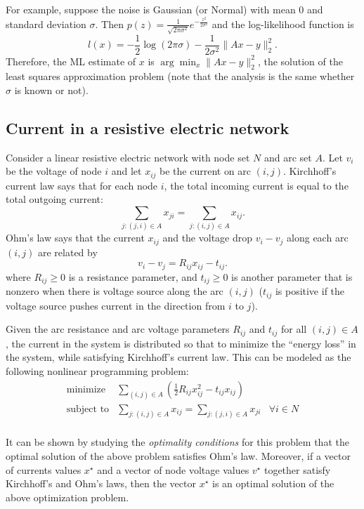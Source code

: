 \documentclass[11pt]{article}
\newcommand{\oh}{\frac12}
\newcommand{\st}{\text{subject to}}
\begin{document}
For example, suppose the noise is Gaussian (or Normal) with mean $0$ and standard deviation $\sigma$. Then $p(z)=\frac{1}{\sqrt{2\pi\sigma^2}}e^{-\frac{z^2}{2\sigma^2}}$ and the log-likelihood function is
$$
l(x)=-\oh\log(2\pi\sigma)-\frac{1}{2\sigma^2}\|Ax-y\|_2^2.
$$
Therefore, the ML estimate of $x$ is $\arg\min_x\|Ax-y\|_2^2$, the solution of the least squares approximation problem (note that the analysis is the same whether $\sigma$ is known or not).

\subsection{Current in a resistive electric network}

Consider a linear resistive electric network with node set $N$ and arc set $A$. Let $v_i$ be the  voltage of node $i$ and let $x_{ij}$ be the current on arc $(i,j)$. Kirchhoff's current law says that  for each node $i$, the total incoming current is equal to the total outgoing current: 
$$
\sum_{j:(j,i)\in A}x_{ji}=\sum_{j:(i,j)\in A}x_{ij}.
$$
Ohm's law says that the current $x_{ij}$ and the voltage drop $v_i-v_j$ along each arc $(i, j )$ are related by 
$$
v_i-v_j=R_{ij}x_{ij}-t_{ij}.
$$
where $R_{ij}\ge0$ is a resistance parameter, and $t_{ij}\ge0$ is another parameter that is nonzero when  there is voltage source along the arc $(i, j )$ ($t_{ij}$ is positive if the voltage source pushes current in the direction from $i$ to $j$). 



Given the arc resistance and arc voltage parameters $R_{ij}$ and $t_{ij}$ for all $(i,j)\in A$, the current in the system is distributed so that to minimize the ``energy loss'' in the system, while satisfying Kirchhoff's current law. This can be modeled as the following nonlinear
programming problem:
$$
\begin{array}{cll}
\text{minimize}&\sum_{(i,j)\in A}\left(\oh R_{ij}x_{ij}^2-t_{ij}x_{ij}\right)\\
\st&\sum_{j:(i,j)\in A}x_{ij}=\sum_{j:(j,i)\in
A}x_{ji}&\forall i\in N\\
\end{array}
$$

It can be shown by studying the \emph{optimality conditions} for this
problem that the optimal solution  of the
above problem satisfies Ohm's law. Moreover, if a vector of currents values $x^\star$ and a vector of node voltage values $v^\star$ together satisfy Kirchhoff's and Ohm's laws, then the vector $x^\star$ is an optimal solution of the above optimization problem.
\end{document}
